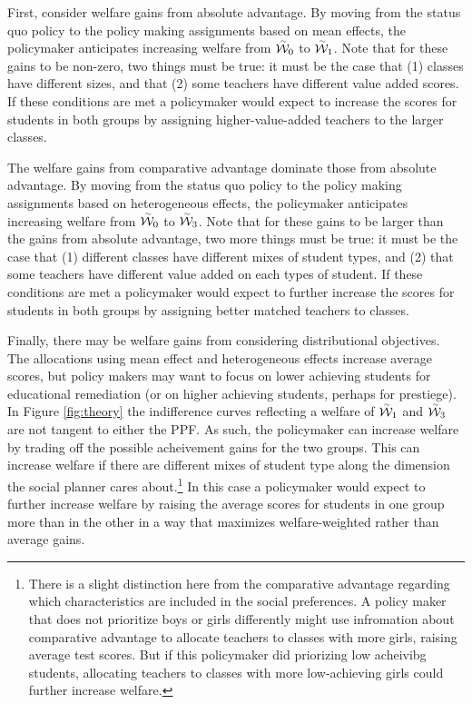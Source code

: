 \documentclass[12pt]{article}
\theoremstyle{definition}
\theoremstyle{definition}
\theoremstyle{definition}
\theoremstyle{definition}
\begin{document}
First, consider welfare gains from absolute advantage. By moving from the status quo policy to the policy making assignments based on mean effects, the policymaker anticipates increasing welfare from $\accentset{\sim}{\mathcal{W}}_0$ to $\accentset{\sim}{\mathcal{W}}_1$. Note that for these gains to be non-zero, two things must be true: it must be the case that (1) classes have different sizes, and that (2) some teachers have different value added scores. If these conditions are met a policymaker would expect to  increase the scores for students in both groups by assigning higher-value-added teachers to the larger classes.

The welfare gains from comparative advantage dominate those from absolute advantage. By moving from the status quo policy to the policy making assignments based on heterogeneous effects, the policymaker anticipates increasing welfare from $\accentset{\sim}{\mathcal{W}}_0$ to $\accentset{\sim}{\mathcal{W}}_3$. Note that for these gains to be larger than the gains from absolute advantage, two more things must be true: it must be the case that  (1) different classes have different mixes of student types, and (2) that some teachers have different value added on each types of student. If these conditions are met a policymaker would expect to further increase the scores for students in both groups by assigning better matched teachers to classes.



Finally, there may be welfare gains from considering distributional objectives. The allocations using mean effect and heterogeneous effects increase average scores, but policy makers may want to focus on lower achieving students for educational remediation (or on higher achieving students, perhaps for prestiege). In Figure \ref{fig:theory} the indifference curves reflecting a welfare of $\accentset{\sim}{\mathcal{W}}_1$ and $\accentset{\sim}{\mathcal{W}}_3$ are not tangent to either the PPF. As such, the policymaker can increase welfare by trading off the possible acheivement gains for the two groups. This can increase welfare if there are different mixes of student type along the dimension the social planner cares about.\footnote{There is a slight distinction here from the comparative advantage regarding which characteristics are included in the social preferences. A policy maker that does not prioritize boys or girls differently might use infromation about comparative advantage to allocate teachers to classes with more girls, raising average test scores. But if this policymaker did priorizing low acheivibg students, allocating teachers to classes with more low-achieving girls could further increase welfare.} In this case a policymaker would expect to further increase welfare by raising the average scores for students in one group more than in the other in a way that maximizes welfare-weighted rather than average gains.
\end{document}
